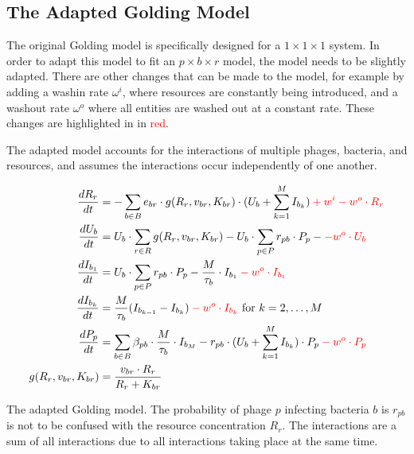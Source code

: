 \subsection{The Adapted Golding Model}
\label{sec:adapted_golding_model}
The original Golding model is specifically designed for a $1\times 1 \times 1$ system. 
In order to adapt this model to fit an $p \times b \times r$ model, the model needs to be slightly adapted. 
There are other changes that can be made to the model, for example by adding a washin rate $\omega^{i}$, where resources are constantly being introduced, and a washout rate $\omega^{o}$ where all entities are washed out at a constant rate. 
These changes are highlighted in  in \textcolor{red}{red}. 

The adapted model accounts for the interactions of multiple phages, bacteria, and resources, and assumes the interactions occur independently of one another. 

\begin{eqfloat}
    \begin{align}
        \frac{dR_r}{dt} &= -\sum_{b \in B} e_{b r} \cdot g(R_r, v_{b r}, K_{b r})\cdot (U_b + \sum_{k=1}^{M} I_{b_k}) \mathcolor{red}{+ w^i -w^o \cdot R_r}\\
        \frac{dU_b}{dt} &= U_b \cdot \sum_{r \in R} g(R_r, v_{b r}, K_{b r}) - U_b \cdot \sum_{p \in P} r_{p b} \cdot P_p -\mathcolor{red}{-w^o \cdot U_b}\\
        \frac{dI_{b_1}}{dt} &= U_b \cdot \sum_{p \in P}r_{p b} \cdot P_p - \frac{M}{\tau_b}\cdot I_{b_1} \mathcolor{red}{-w^o \cdot I_{b_1}}\\
        \frac{dI_{b_k}}{dt} &= \frac{M}{\tau_b}(I_{b_{k-1}}-I_{b_k}) \mathcolor{red}{-w^o \cdot I_{b_k}}\text{ for } k=2, \dots, M \\
        \frac{dP_p}{dt} &= \sum_{b\in B}\beta_{p b}\cdot\frac{M}{\tau_b} \cdot I_{b_M} - r_{p b}\cdot(U_b + \sum_{k=1}^{M} I_{b_k})\cdot P_p \mathcolor{red}{-w^o \cdot P_p}\\
        g(R_r, v_{b r}, K_{b r}) &= \frac{v_{b r} \cdot R_r}{R_r + K_{b r}}
        \label{eq:adapted_golding_model}
    \end{align} 
    \caption{
        The adapted Golding model. 
        The probability of phage $p$ infecting bacteria $b$ is $r_{p b}$ is not to be confused with the resource concentration $R_r$. 
        The interactions are a sum of all interactions due to all interactions taking place at the same time. 
    }
\end{eqfloat}